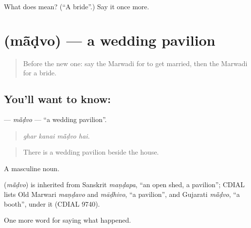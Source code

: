 \begin{tcolorbox}[breakable,colback=teal!4,colframe=teal!35!black,title={Before you move on}]
What does  mean? (\textquotedblleft{}A bride\textquotedblright{}.) Say it once more.
\end{tcolorbox}
\section[\texorpdfstring{\mw{मांडवो} (mā̃ḍvo)}{मांडवो (mā̃ḍvo)}]{ (mā̃ḍvo) — a wedding pavilion}

\label{lesson:MW-C247-madvo}



\begin{quote}
Before the new one: say the Marwadi for to get married, then the Marwadi for a bride.
\end{quote}

\subsection*{You'll want to know: }
\textbf{} — \emph{mā̃ḍvo} — \textquotedblleft{}a wedding pavilion\textquotedblright{}.

\begin{quote}
   
\end{quote}

\begin{quote}
\emph{ghar kanai mā̃ḍvo hai.}
\end{quote}

\begin{quote}
There is a wedding pavilion beside the house.
\end{quote}

A masculine noun.

\begin{cousinweb}
\textbf{} (\emph{mā̃ḍvo}) is inherited from Sanskrit \emph{maṇḍapa}, \textquotedblleft{}an open shed, a pavilion\textquotedblright{}; CDIAL lists Old Marwari \emph{maṇḍavo} and \emph{māḍhivo}, \textquotedblleft{}a pavilion\textquotedblright{}, and Gujarati \emph{mā̃ḍvo}, \textquotedblleft{}a booth\textquotedblright{}, under it (CDIAL 9740).
\end{cousinweb}

\begin{grammarlens}[title={What you've built}]
One more word for saying what happened.
\end{grammarlens}

